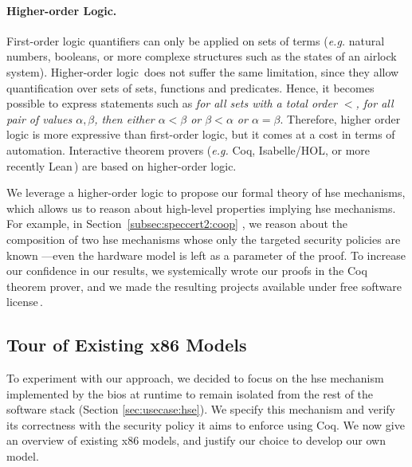 \paragraph{Higher-order Logic.}
%
First-order logic quantifiers can only be applied on sets of terms (\emph{e.g.}
natural numbers, booleans, or more complexe structures such as the states of an airlock system).
%
Higher-order logic\,\cite{leivant1994hol} does not suffer the same limitation,
since they allow quantification over sets of sets, functions and predicates.
%
Hence, it becomes possible to express statements such as \emph{for all sets with
  a total order \( < \), for all pair of values \( \alpha, \beta \), then either
  \( \alpha < \beta \) or \( \beta < \alpha \) or \( \alpha = \beta \)}.
%
Therefore, higher order logic is more expressive than first-order logic, but it
comes at a cost in terms of automation.
%
Interactive theorem provers (\emph{e.g.}  Coq, Isabelle/HOL,  or more recently
Lean\,\cite{de2015lean}) are based on higher-order logic.

We leverage a higher-order logic to propose our formal theory of \ac{hse}
mechanisms, which allows us to reason about high-level properties implying
\ac{hse} mechanisms. For example, in Section~\ref{subsec:speccert2:coop} , we
reason about the composition of two \ac{hse} mechanisms whose only the targeted
security policies are known ---even the hardware model is left as a parameter of
the proof.
%
To increase our confidence in our results, we systemically wrote our proofs in
the Coq theorem prover, and we made the resulting projects available under free
software license\,\cite{letan2016speccertcode,letan2018freespeccode}. 


\subsection{Tour of Existing x86 Models}
\label{subsec:sota:ltsrelated}

To experiment with our approach, we decided to focus on the \ac{hse} mechanism
implemented by the \ac{bios} at runtime to remain isolated from the rest of the
software stack (Section \ref{sec:usecase:hse}). We specify this mechanism and verify its correctness with the security policy it aims to enforce using Coq.
%
We now give an overview of existing x86 models, and justify our choice to
develop our own model.

